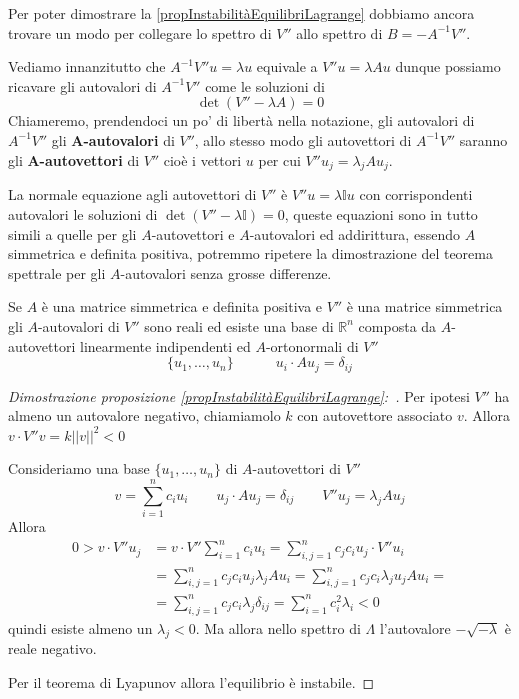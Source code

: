 \documentclass[11pt,a4paper,twoside]{book}
\newenvironment{importante}[0]{ 
  \begin{center}\begin{tcolorbox}[enhanced,
  before skip=2mm,after skip=3mm,
  boxrule=0.4pt,left=5mm,right=2mm,top=1mm,bottom=1mm,
  colback=yellow!50,
  colframe=yellow!20!black,
  sharp corners,arc=3mm,
  underlay={
  	\path[fill=red!50!black,draw=none] (interior.south west) rectangle 			node[white]{\Huge\bfseries !} ([xshift=4mm]interior.north west);
  },
  drop fuzzy shadow]
  }{
 \normalsize \end{tcolorbox}\end{center}
}
\newenvironment{dimo}[1][\proofname]{
	\begin{tcolorbox}[
	breakable, 
	enhanced, 
	interior hidden, 
	frame hidden, 
	borderline west = {1pt}{0pt}{gray}, 
	top=0pt, bottom=0pt, left=0pt]
\begin{proof}[#1:~]
}
{
\end{proof}
\end{tcolorbox}
}
\theoremstyle{esss}
\theoremstyle{dotless}
\numberwithin{equation}{section} %
\begin{document}
Per poter dimostrare la \ref{propInstabilitàEquilibriLagrange} dobbiamo ancora trovare un modo per collegare lo spettro di $V''$ allo spettro di $B=-A^{-1}V''$.

Vediamo innanzitutto che $A^{-1}V'' u = \lambda u$ equivale a $V'' u = \lambda A u$ dunque possiamo ricavare gli autovalori di $A^{-1}V''$ come le soluzioni di
\begin{equation}
\det(V''-\lambda A)=0
\end{equation}
Chiameremo, prendendoci un po' di libertà nella notazione, gli autovalori di $A^{-1}V''$ gli \textbf{A-autovalori} di $V''$, allo stesso modo gli autovettori di $A^{-1}V''$ saranno gli \textbf{A-autovettori} di $V''$ cioè i vettori $u$ per cui $V''u_j=\lambda_j Au_j$.\par
La normale equazione agli autovettori di $V''$ è $V'' u=\lambda \mathbb{I}u$ con corrispondenti autovalori le soluzioni di $\det(V''-\lambda \mathbb{I})=0$, queste equazioni sono in tutto simili a quelle per gli $A$-autovettori e $A$-autovalori ed addirittura, essendo $A$ simmetrica e definita positiva, potremmo ripetere la dimostrazione del teorema spettrale per gli $A$-autovalori senza grosse differenze. 

\begin{importante}
Se $A$ è una matrice simmetrica e definita positiva e $V''$ è una matrice simmetrica gli $A$-autovalori di $V''$ sono reali ed esiste una base di $\mathbb{R}^n$ composta da $A$-autovettori linearmente indipendenti ed $A$-ortonormali di $V''$
\[
\{
u_1,\dots,u_n
\}\qquad \quad
u_i\cdot Au_j=\delta_{ij}
\]
\end{importante}

\begin{dimo}[Dimostrazione proposizione \ref{propInstabilitàEquilibriLagrange}]
Per ipotesi $V''$ ha almeno un autovalore negativo, chiamiamolo $k$ con autovettore associato $v$. Allora $v\cdot V''v=k\left|\left|v\right|\right|^2<0$

Consideriamo una base $\{ u_1,\dots,u_n\}$ di $A$-autovettori di $V''$ 
\[
v=\sum_{i=1}^n c_i u_i  \qquad u_j\cdot Au_j=\delta_{ij} \qquad V'' u_j = \lambda_j Au_j
\]
Allora
\begin{align*}
0> v\cdot V''u_j &= v\cdot V''\sum_{i=1}^n c_i u_i = \sum_{i,j=1}^n c_jc_i u_j\cdot V'' u_i \\
&= \sum_{i,j=1}^n c_jc_i u_j\lambda_j A u_i = \sum_{i,j=1}^n c_jc_i\lambda_j u_j A u_i=\\
&=\sum_{i,j=1}^n c_jc_i\lambda_j \delta_{ij}= \sum_{i=1}^n c_i^2\lambda_i<0
\end{align*}
quindi esiste almeno un $\lambda_j<0$. Ma allora nello spettro di $\Lambda$ l'autovalore $-\sqrt{-\lambda}$ è reale negativo.

Per il teorema di Lyapunov allora l'equilibrio è instabile. \qedhere
\end{dimo}
\end{document}
